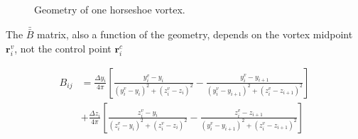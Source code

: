 \documentclass[10pt, a4paper]{article}
\begin{document}
\begin{figure}[h!]
\begin{subfigmatrix}{2}
 \end{subfigmatrix}
 \caption{Geometry of one horseshoe vortex.}
\label{f:singlevortex}
\end{figure}

The $\bar{\bar{B}}$ matrix, also a function of the geometry, depends on the vortex midpoint $\mathbf{r}_i^v$, not the control point $\mathbf{r}_i^c$

\begin{align}
    B_{ij} &= \frac{\Delta y_i}{4\pi} \left[ \frac{y_i^v - y_i}{{(y_i^v - y_i)}^2 + {(z_i^v - z_i)}^2} - \frac{y_i^v - y_{i+1}}{{(y_i^v - y_{i+1})}^2 + {(z_i^v - z_{i+1})}^2} \right] \\
    &+ \frac{\Delta z_i}{4\pi} \left[ \frac{z_i^v - y_i}{{(z_i^v - y_i)}^2 + {(z_i^v - z_i)}^2} - \frac{z_i^v - z_{i+1}}{{(y_i^v - y_{i+1})}^2 + {(z_i^v - z_{i+1})}^2} \right] \nonumber
\end{align}
\end{document}
